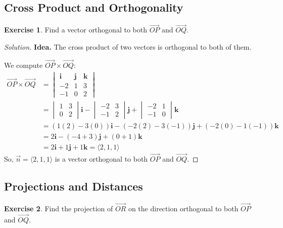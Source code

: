 \documentclass[11pt]{article}
\theoremstyle{definition}
\newtheorem{exercise}{Exercise}[section]
\newenvironment{solution}{\begin{proof}[Solution]}{\end{proof}}
\begin{document}
\subsection{Cross Product and Orthogonality}

\begin{exercise}
Find a vector orthogonal to both $\vec{OP}$ and $\vec{OQ}$.
\end{exercise}

\begin{solution}
\textbf{Idea.} The cross product of two vectors is orthogonal to both of them.

We compute $\vec{OP} \times \vec{OQ}$:
\begin{align*}
\vec{OP} \times \vec{OQ} &= 
\begin{vmatrix}
\mathbf{i} & \mathbf{j} & \mathbf{k} \\
-2 & 1 & 3 \\
-1 & 0 & 2
\end{vmatrix} \\
&= 
\begin{vmatrix}
1 & 3 \\
0 & 2
\end{vmatrix}\mathbf{i}
-
\begin{vmatrix}
-2 & 3 \\
-1 & 2
\end{vmatrix}\mathbf{j}
+
\begin{vmatrix}
-2 & 1 \\
-1 & 0
\end{vmatrix}\mathbf{k} \\
&= (1(2) - 3(0))\mathbf{i} - (-2(2) - 3(-1))\mathbf{j} + (-2(0) - 1(-1))\mathbf{k} \\
&= 2\mathbf{i} - (-4 + 3)\mathbf{j} + (0 + 1)\mathbf{k} \\
&= 2\mathbf{i} + 1\mathbf{j} + 1\mathbf{k} = \langle 2, 1, 1 \rangle
\end{align*}
So, $\vec{n} = \langle 2, 1, 1 \rangle$ is a vector orthogonal to both $\vec{OP}$ and $\vec{OQ}$.
\end{solution}

\subsection{Projections and Distances}

\begin{exercise}
Find the projection of $\vec{OR}$ on the direction orthogonal to both $\vec{OP}$ and $\vec{OQ}$.
\end{exercise}
\end{document}
